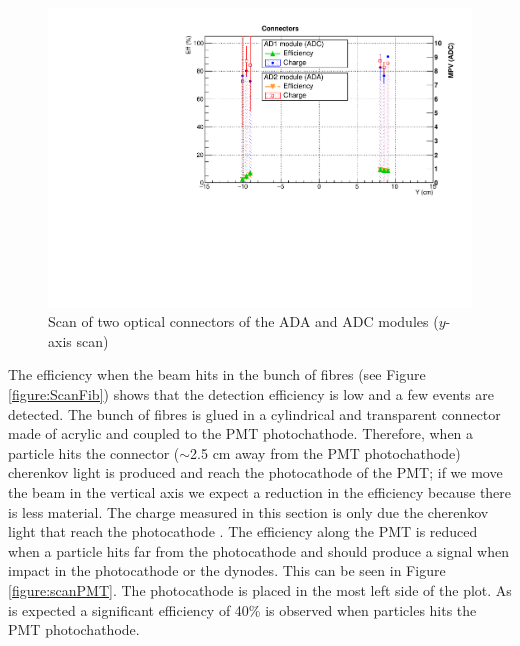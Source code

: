 	\begin{figure}[h!]
		\begin{center}
			\includegraphics[scale=0.5]{./images/scan/Connectors_scan.pdf}
			\caption{Scan of two optical connectors of the ADA and ADC modules ($y$-axis scan)}
			\label{figure:ScanConn}
		\end{center}
	\end{figure}
	The efficiency when the beam hits in the bunch of fibres (see Figure \ref{figure:ScanFib}) shows that the detection efficiency is low and a few events are detected. The bunch of fibres is glued in a cylindrical and transparent connector made of acrylic and coupled to the PMT photochathode. Therefore, when a particle hits the connector ($\sim$2.5 cm away from the PMT photochathode) cherenkov light is produced and reach the photocathode of the PMT; if we move the beam in the vertical axis we expect a reduction in the efficiency because there is less material. The charge measured in this section is only due the cherenkov light that reach the photocathode \cite{ClearFib-performace}.
	The efficiency along the PMT is reduced when a particle hits far from the photocathode and should produce a 
	signal when impact in the photocathode or the dynodes. This can be seen in Figure \ref{figure:scanPMT}. %
	The photocathode is placed in the most left side of the plot. As is expected a significant efficiency of 40\% 
	is observed when particles hits the PMT photochathode.
	

